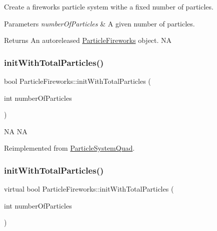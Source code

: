 Create a fireworks particle system withe a fixed number of particles.


\begin{DoxyParams}{Parameters}
{\em number\+Of\+Particles} & A given number of particles. \\
\hline
\end{DoxyParams}
\begin{DoxyReturn}{Returns}
An autoreleased \hyperlink{classParticleFireworks}{Particle\+Fireworks} object.  NA 
\end{DoxyReturn}
\mbox{\label{classParticleFireworks_a3f2126134f1932867e4160f984b973fe}} 
\subsubsection{\texorpdfstring{init\+With\+Total\+Particles()}{initWithTotalParticles()}\hspace{0.1cm}{\footnotesize\ttfamily [1/2]}}
{\footnotesize\ttfamily bool Particle\+Fireworks\+::init\+With\+Total\+Particles (\begin{DoxyParamCaption}\item[{int}]{number\+Of\+Particles }\end{DoxyParamCaption})\hspace{0.3cm}{\ttfamily [virtual]}}

NA  NA 

Reimplemented from \hyperlink{classParticleSystemQuad_ae5420007b57e909c05e7476a54fbfbe9}{Particle\+System\+Quad}.

\mbox{\label{classParticleFireworks_aed2a65f083e9ec8fd2310e38914d3906}} 
\subsubsection{\texorpdfstring{init\+With\+Total\+Particles()}{initWithTotalParticles()}\hspace{0.1cm}{\footnotesize\ttfamily [2/2]}}
{\footnotesize\ttfamily virtual bool Particle\+Fireworks\+::init\+With\+Total\+Particles (\begin{DoxyParamCaption}\item[{int}]{number\+Of\+Particles }\end{DoxyParamCaption})\hspace{0.3cm}{\ttfamily [virtual]}}

